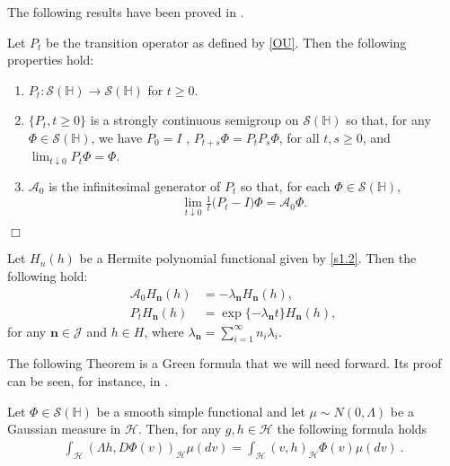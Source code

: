 \documentclass[review,onefignum,onetabnum]{siamart190516}
\begin{document}
    The following results have been proved in \cite{liu}.
    \begin{lemma}
        Let $P_t$ be the transition operator as defined by \eqref{OU}. Then
        the following properties hold:
        \begin{enumerate}
         \item
            $P_t : \mathcal{S}(\mathbb{H})\rightarrow  \mathcal{S}(\mathbb{H})$
            for $t \ge 0$.
        \item
            $\{P_t , t \ge 0\}$
            is a strongly continuous semigroup on
            $\mathcal{S}(\mathbb{H})$ so that, for any
            $\Phi \in \mathcal{S}(\mathbb{H})$, we have $P_0 = I$ ,
            $P_{t+s} \Phi = P_t P_s \Phi$, for all $t, s \ge 0$, and
            $\lim_{t\downarrow 0}
            P_t \Phi = \Phi$.
        \item
            $\mathcal{A}_0$ is the infinitesimal generator of $P_t$ so that, for
            each $\Phi\in\mathcal{S}(\mathbb{H})$,
            \[
                \lim_{t\downarrow 0} \tfrac{1}{t}\big(P_t- I\big)\Phi
                    = \mathcal{A}_0\Phi.
            \]
        \end{enumerate}
        \hfill $\Box$
    \end{lemma}

    \begin{lemma}\label{Pt-Her}
            Let $H_n(h)$ be a Hermite polynomial functional given by 
            \eqref{s1.2}.
            Then the following hold:
        \begin{align}
            \mathcal{A}_0 H_{\mathbf{n}}(h) 
                &= -\lambda_{\mathbf{n}} H_{\mathbf{n}}(h),
                \\
            P_t H_{\mathbf{n}} (h)
                &= \exp\{-\lambda_{\mathbf{n}} t\} H_{\mathbf{n}} (h),
        \end{align}
        for any $\mathbf{n}\in\mathcal{J}$ and $h \in H$, where
        $
            \displaystyle
            \lambda_{\mathbf{n}}=\sum_{i=1}^\infty n_i\lambda_i.
        $
    \end{lemma}

    The following Theorem is a Green formula that we will need forward.
    Its proof can be seen, for instance, in \cite[][Thm. 3.3, Ch. 9]{liu}.

    \begin{theorem}\label{green-form}
        Let
        $
            \Phi \in \mathcal{S}(\mathbb{H})
        $ be a smooth simple functional and let
        $\mu\sim N(0,\Lambda)$ be a Gaussian measure in $\mathcal{H}$. Then,
        for any $g,h\in\mathcal{H}$ the following formula holds
        \begin{align}
            \int_{\mathcal{H}} (\Lambda h,D\Phi(v))_{\mathcal{H}}  \mu(dv) =
                \int_{\mathcal{H}} (v,h)_{\mathcal{H}}
                \Phi(v) \mu(dv) \ .
                \label{s2.2.1}
        \end{align}
    \end{theorem}
\end{document}
